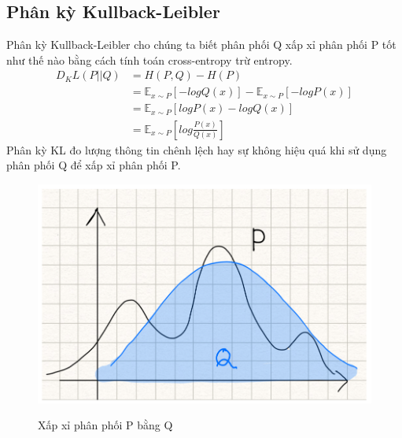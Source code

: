 \subsection{Phân kỳ Kullback-Leibler}
Phân kỳ Kullback-Leibler cho chúng ta biết phân phối Q xấp xỉ phân phối P tốt như thế nào bằng cách tính toán cross-entropy trừ entropy.
\begin{align*}
D_KL(P||Q) &= H(P,Q) - H(P)\\
& = \mathbb{E}_{x\sim P}[-logQ(x)] - \mathbb{E}_{x\sim P}[-logP(x)]\\
& = \mathbb{E}_{x\sim P}[logP(x)-logQ(x)]\\
& = \mathbb{E}_{x\sim P}[log\frac{P(x)}{Q(x)}]
\end{align*}
Phân kỳ KL đo lượng thông tin chênh lệch hay sự không hiệu quá khi sử dụng phân phối Q để xấp xỉ phân phối P.
\begin{figure}[h]
	\begin{center}
		\includegraphics[height=.28\textheight]{Chuong2/Figs/KL.png}
		\label{fig:KL}
		\caption{Xấp xỉ phân phối P bằng Q}
	\end{center}
\end{figure}


